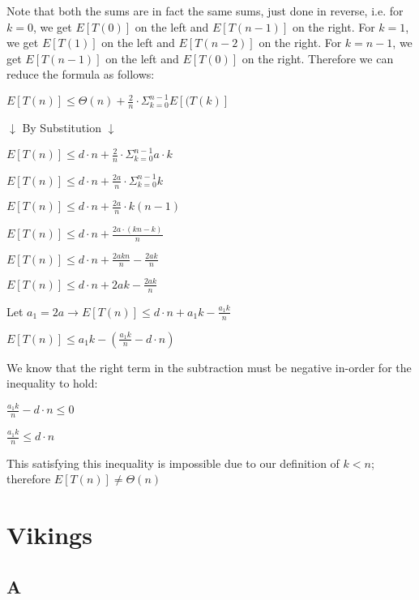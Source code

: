 \documentclass[12pt]{article}
\begin{document}
Note that both the sums are in fact the same sums, just done in reverse, i.e. for $k = 0$, we get $E[T(0)]$ on the left and $E[T(n-1)]$ on the right. For $k = 1$, we get $E[T(1)]$ on the left and $E[T(n-2)]$ on the right. For $k = n-1$, we get $E[T(n-1)]$ on the left and $E[T(0)]$ on the right. Therefore we can reduce the formula as follows:

\begin{center}

$E[T(n)] \leq \Theta(n) + \frac{2}{n} \cdot \Sigma_{k=0}^{n-1} E[(T(k)]$

$\downarrow$ By Substitution $\downarrow$

$E[T(n)] \leq d \cdot n + \frac{2}{n} \cdot \Sigma_{k=0}^{n-1} a \cdot k$

$E[T(n)] \leq d \cdot n + \frac{2a}{n} \cdot \Sigma_{k=0}^{n-1} k$

$E[T(n)] \leq d \cdot n + \frac{2a}{n} \cdot  k(n-1)$

$E[T(n)] \leq d \cdot n + \frac{2a \cdot (kn-k) }{n}$

$E[T(n)] \leq d \cdot n + \frac{2akn}{n} - \frac{2ak}{n}$

$E[T(n)] \leq d \cdot n + 2ak - \frac{2ak}{n}$

Let $a_{1} = 2a \rightarrow E[T(n)] \leq d \cdot n + a_{1}k - \frac{a_{1}k}{n}$

$E[T(n)] \leq  a_{1}k - (\frac{a_{1}k}{n} - d \cdot n)$


\end{center}

We know that the right term in the subtraction must be negative in-order for the inequality to hold:

\begin{center}

$\frac{a_{1}k}{n} - d \cdot n \leq 0$

$\frac{a_{1}k}{n}  \leq d \cdot n$

\end{center}

This satisfying this inequality is impossible due to our definition of $k < n$; therefore $E[T(n)] \neq \Theta(n)$

\pagebreak

\section{Vikings}

\subsection{A}
\end{document}

